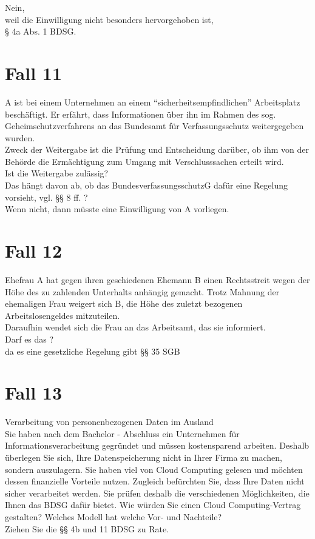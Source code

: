 \documentclass[a4paper,10pt]{scrartcl}
\begin{document}
Nein,\\ 
weil die Einwilligung nicht besonders hervorgehoben ist, \\

§ 4a Abs. 1 BDSG.

\section{Fall 11}

A ist bei einem Unternehmen an einem “sicherheitsempfindlichen” 
Arbeitsplatz beschäftigt. Er erfährt, dass Informationen über ihn im 
Rahmen des sog. Geheimschutzverfahrens an das Bundesamt für 
Verfassungsschutz weitergegeben wurden. \\

Zweck der Weitergabe ist die Prüfung und Entscheidung darüber, ob
ihm von der Behörde die Ermächtigung zum Umgang mit 
Verschlusssachen erteilt wird.  \\

Ist die Weitergabe zulässig?\\

Das hängt davon ab, ob das                             
BundesverfassungsschutzG dafür eine Regelung vorsieht, vgl. §§ 8 ff. ?\\

Wenn nicht, dann müsste eine Einwilligung von A vorliegen.\\

\section{Fall 12}

Ehefrau A hat gegen ihren geschiedenen Ehemann B einen 
Rechtsstreit wegen der Höhe des zu zahlenden Unterhalts anhängig 
gemacht. Trotz Mahnung der ehemaligen Frau weigert sich B, die 
Höhe des zuletzt bezogenen Arbeitslosengeldes mitzuteilen. \\

Daraufhin wendet sich die Frau an das Arbeitsamt, das sie informiert. \\

Darf es das ? \\ da es eine gesetzliche Regelung gibt §§ 35 SGB


\section{Fall 13}
Verarbeitung von personenbezogenen Daten im Ausland\\
Sie haben nach dem Bachelor - Abschluss ein Unternehmen für 
Informationsverarbeitung gegründet und müssen 
kostensparend arbeiten. Deshalb überlegen Sie sich, Ihre 
Datenspeicherung nicht in Ihrer Firma zu machen, sondern 
auszulagern. Sie haben viel von Cloud Computing gelesen und 
möchten dessen finanzielle Vorteile nutzen. Zugleich befürchten 
Sie, dass Ihre Daten nicht sicher verarbeitet werden. Sie prüfen 
deshalb die verschiedenen Möglichkeiten, die Ihnen das BDSG 
dafür bietet. Wie würden Sie einen Cloud Computing-Vertrag 
gestalten? Welches Modell hat welche Vor- und Nachteile?\\ 
Ziehen Sie die §§ 4b und 11 BDSG zu Rate. \\
\end{document}
